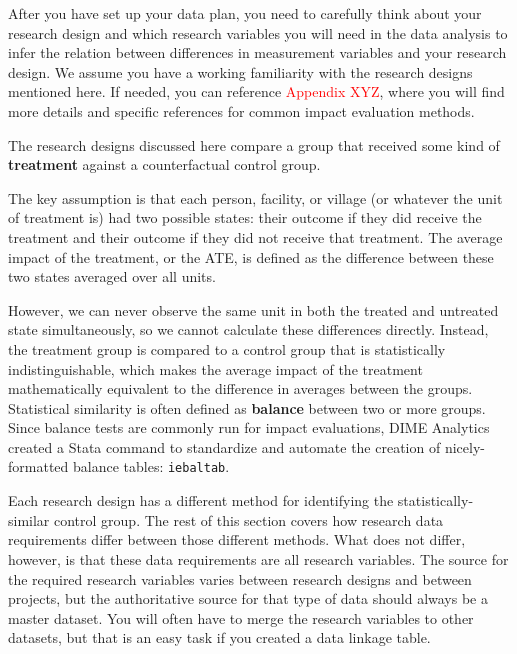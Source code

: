 After you have set up your data plan,
you need to carefully think about your research design
and which research variables you will need in the data analysis
to infer the relation between differences in measurement variables
and your research design.
We assume you have a working familiarity
with the research designs mentioned here.
If needed, you can reference \textcolor{red}{Appendix XYZ},
where you will find more details
and specific references for common impact evaluation methods.

The research designs discussed here compare a group that received
some kind of \textbf{treatment}
against a counterfactual control group.

The key assumption is that each
person, facility, or village
(or whatever the unit of treatment is)
had two possible states: their outcome if they did receive the treatment
and their outcome if they did not receive that treatment.
The average impact of the treatment, or the ATE,
is defined as the difference
between these two states averaged over all units.

However, we can never observe the same unit
in both the treated and untreated state simultaneously,
so we cannot calculate these differences directly.
Instead, the treatment group is compared to a control group
that is statistically indistinguishable,
which makes the average impact of the treatment
mathematically equivalent to
the difference in averages between the groups.
Statistical similarity is often defined
as \textbf{balance} between two or more groups.
Since balance tests are commonly run for impact evaluations,
DIME Analytics created a Stata command to
standardize and automate the creation of nicely-formatted balance tables:
\texttt{iebaltab}.

Each research design has a different method for
identifying the statistically-similar control group.
The rest of this section covers how research data requirements
differ between those different methods.
What does not differ, however,
is that these data requirements are all research variables.
The source for the required research variables varies
between research designs and between projects,
but the authoritative source for that type of data should
always be a master dataset.
You will often have to merge
the research variables to other datasets,
but that is an easy task
if you created a data linkage table.


